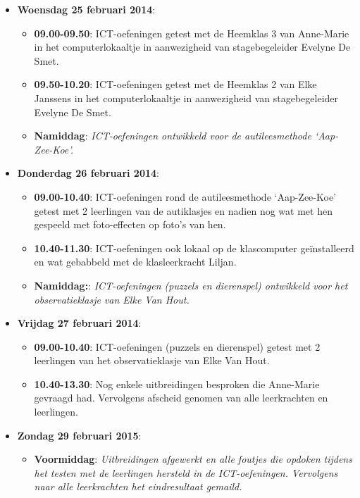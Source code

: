 \documentclass[a4paper,11pt]{article}
\theoremstyle{definition}
\begin{document}
\begin{itemize}
  \item  \textbf{Woensdag 25 februari 2014}:     
  \begin{itemize}
    \item \textbf{09.00-09.50}:   ICT-oefeningen getest met de Heemklas 3 van Anne-Marie in het computerlokaaltje in aanwezigheid van stagebegeleider Evelyne De Smet.
     \item \textbf{09.50-10.20}:   ICT-oefeningen getest met de Heemklas 2 van Elke Janssens in het computerlokaaltje in aanwezigheid van stagebegeleider Evelyne De Smet.
     \item \textbf{Namiddag}: \emph{ICT-oefeningen ontwikkeld voor de autileesmethode `Aap-Zee-Koe'.}
  \end{itemize}
   \item  \textbf{Donderdag 26 februari 2014}:     
  \begin{itemize}
    \item \textbf{09.00-10.40}:   ICT-oefeningen rond de autileesmethode `Aap-Zee-Koe' getest met 2 leerlingen 
    van de autiklasjes    en nadien nog wat met hen gespeeld met foto-effecten op foto's van hen.
        \item \textbf{10.40-11.30}:  ICT-oefeningen ook lokaal op de 
        klascomputer geïnstalleerd en wat gebabbeld met de klasleerkracht 
        Liljan.
     \item \textbf{Namiddag:}: \emph{ICT-oefeningen (puzzels en dierenspel) ontwikkeld voor het observatieklasje van Elke Van Hout.}
     \end{itemize}
     \item  \textbf{Vrijdag 27 februari 2014}:     
  \begin{itemize}
    \item \textbf{09.00-10.40}:   ICT-oefeningen (puzzels en dierenspel) getest 
    met 2 leerlingen van het observatieklasje van Elke Van Hout.
   \item \textbf{10.40-13.30}:  Nog enkele uitbreidingen besproken die Anne-Marie gevraagd had. 
   Vervolgens afscheid genomen van alle leerkrachten en leerlingen.
   \end{itemize}
   
 \item \textbf{Zondag 29 februari 2015}:  
 \begin{itemize}
    \item \textbf{Voormiddag}: \emph{Uitbreidingen afgewerkt en alle foutjes die opdoken tijdens het testen met de leerlingen hersteld in de ICT-oefeningen. Vervolgens
    naar alle leerkrachten het eindresultaat gemaild.}
    
  \end{itemize}
  \end{itemize}
  
\end{document}
